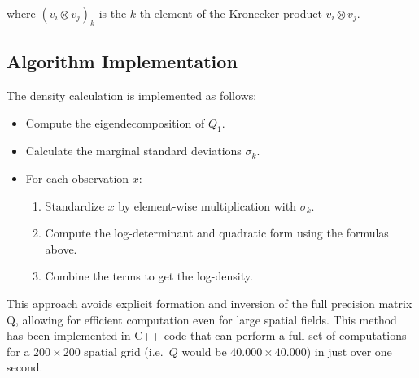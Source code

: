 \documentclass[journal=,manuscript=]{achemso}
\providecommand{\tightlist}{%
  \setlength{\itemsep}{0pt}\setlength{\parskip}{0pt}}\usepackage{longtable,booktabs,array}
\begin{document}
where \((v_i \otimes v_j)_k\) is the \(k\)-th element of the Kronecker
product \(v_i \otimes v_j\).

\subsection{Algorithm Implementation}\label{algorithm-implementation}

The density calculation is implemented as follows:

\begin{itemize}
\tightlist
\item
  Compute the eigendecomposition of \(Q_1\).
\item
  Calculate the marginal standard deviations \(\sigma_k\).
\item
  For each observation \(x\):

  \begin{enumerate}
  \def\labelenumi{\alph{enumi}.}
  \tightlist
  \item
    Standardize \(x\) by element-wise multiplication with \(\sigma_k\).
  \item
    Compute the log-determinant and quadratic form using the formulas
    above.
  \item
    Combine the terms to get the log-density.
  \end{enumerate}
\end{itemize}

This approach avoids explicit formation and inversion of the full
precision matrix Q, allowing for efficient computation even for large
spatial fields. This method has been implemented in C++ code that can
perform a full set of computations for a \(200\times 200\) spatial grid
(i.e.~\(Q\) would be \(40.000 \times 40.000\)) in just over one second.
\end{document}
